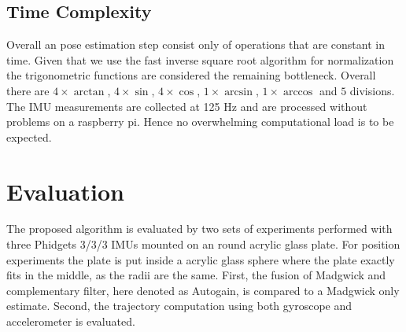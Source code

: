 \documentclass[letterpaper, 10 pt, conference]{ieeeconf}  %
\begin{document}
\subsection{Time Complexity}

Overall an pose estimation step consist only of operations that are constant in time. 
Given that we use the fast inverse square root algorithm \cite{FastInvSqrt} for normalization the trigonometric functions are considered the remaining bottleneck.
Overall there are $4\times\arctan$, $4\times\sin$, $4\times\cos$, $1\times\arcsin$, $1\times\arccos$ and $5$ divisions. 
The IMU measurements are collected at 125 Hz and are processed without problems on a raspberry pi.
Hence no overwhelming computational load is to be expected.

 
 

\section{Evaluation}
The proposed algorithm is evaluated by two sets of experiments performed with three Phidgets 3/3/3 IMUs mounted on an round acrylic glass plate.
For position experiments the plate is put inside a acrylic glass sphere where the plate exactly fits in the middle, as the radii are the same.
First, the fusion of Madgwick and complementary filter, here denoted as Autogain, is compared to a Madgwick only estimate. Second, the trajectory computation using both gyroscope and accelerometer is evaluated.
\end{document}
